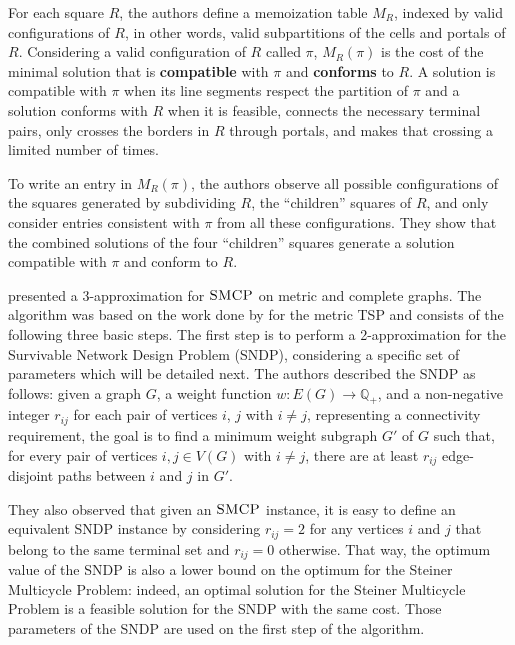 For each square \(R\), the authors define a memoization table \(M_R\), indexed by valid configurations of \(R\), in other words, valid subpartitions of the cells and portals of \(R\). Considering a valid configuration of \(R\) called \(\pi\), \(M_R(\pi)\) is the cost of the minimal solution that is \textbf{compatible} with \(\pi\) and \textbf{conforms} to \(R\). A solution is compatible with \(\pi\) when its line segments respect the partition of \(\pi\) and a solution conforms with \(R\) when it is feasible, connects the necessary terminal pairs, only crosses the borders in \(R\) through portals, and makes that crossing a limited number of times.

To write an entry in \(M_R(\pi)\), the authors observe all possible configurations of the squares generated by subdividing \(R\), the ``children'' squares of \(R\), and only consider entries consistent with \(\pi\) from all these configurations. They show that the combined solutions of the four ``children'' squares generate a solution compatible with \(\pi\) and conform to \(R\).

\cite{smcp_3apx} presented a 3-approximation for \(\textsc{SMCP}\) on metric and complete graphs. The algorithm was based on the work done by \cite{Christofides2022WorstCaseAO} for the metric TSP and consists of the following three basic steps.
The first step is to perform a 2-approximation for the Survivable Network Design Problem (SNDP), considering a specific set of parameters which will be detailed next. The authors described the SNDP as follows: given a graph \(G\), a weight function \(w: E(G) \rightarrow \mathbb{Q}_+\), and a non-negative integer \(r_{ij}\) for each pair of vertices \(i\), \(j\) with \(i \neq j\), representing a connectivity requirement, the goal is to find a minimum weight subgraph \(G'\) of \(G\) such that, for every pair of vertices \(i, j \in V(G)\) with \(i \neq j\), there are at least \(r_{ij}\) edge-disjoint paths between \(i\) and \(j\) in \(G'\).

They also observed that given an \(\textsc{SMCP}\) instance, it is easy to define an equivalent SNDP instance by considering \(r_{ij} = 2\) for any vertices \(i\) and \(j\) that belong to the same terminal set and \(r_{ij} = 0\) otherwise. That way, the optimum value of the SNDP is also a lower bound on the optimum for the Steiner Multicycle Problem: indeed, an optimal solution for the Steiner Multicycle Problem is a feasible solution for the SNDP with the same cost. Those parameters of the SNDP are used on the first step of the algorithm.


